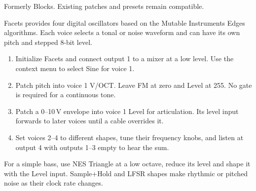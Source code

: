 Formerly Blocks. Existing patches and presets remain compatible.

Facets provides four digital oscillators based on the Mutable Instruments
Edges algorithms. Each voice selects a tonal or noise waveform and can have
its own pitch and stepped 8-bit level.

\begin{enumerate}
\item Initialize Facets and connect output 1 to a mixer at a low level.
Use the context menu to select Sine for voice 1.
\item Patch pitch into voice 1 V/OCT. Leave FM at zero and Level at 255.
No gate is required for a continuous tone.
\item Patch a 0--10\,V envelope into voice 1 Level for articulation. Its
level input forwards to later voices until a cable overrides it.
\item Set voices 2--4 to different shapes, tune their frequency knobs,
and listen at output 4 with outputs 1--3 empty to hear the sum.
\end{enumerate}

For a simple bass, use NES Triangle at a low octave, reduce its level and
shape it with the Level input. Sample+Hold and LFSR shapes make rhythmic or
pitched noise as their clock rate changes.
